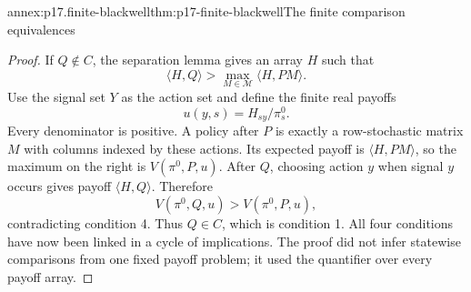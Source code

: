\begin{annexitem}{annex:p17.finite-blackwell}{thm:p17-finite-blackwell}{The finite comparison equivalences}
\begin{proof}
If \(Q\notin C\), the separation lemma gives an array \(H\) such that
\[
                 \langle H,Q\rangle>
                     \max_{M\in\mathcal M}\langle H,PM\rangle.
\]
Use the signal set \(Y\) as the action set and define the finite real
payoffs
\[
                            u(y,s)=H_{sy}/\pi_s^0.
\]
Every denominator is positive. A policy after \(P\) is exactly a
row-stochastic matrix \(M\) with columns indexed by these actions.
Its expected payoff is \(\langle H,PM\rangle\), so the maximum on
the right is \(V(\pi^0,P,u)\).
After \(Q\), choosing action \(y\) when signal \(y\) occurs gives
payoff \(\langle H,Q\rangle\). Therefore
\[
                       V(\pi^0,Q,u)>V(\pi^0,P,u),
\]
contradicting condition 4. Thus \(Q\in C\), which is condition 1.
All four conditions have now been linked in a cycle of implications.
The proof did not infer statewise comparisons from one fixed payoff
problem; it used the quantifier over every payoff array.
\end{proof}
\end{annexitem}

